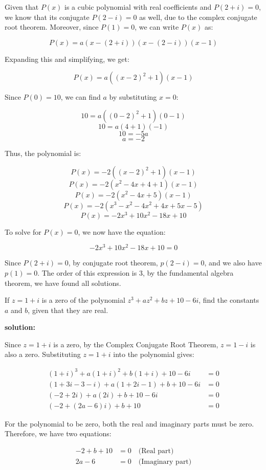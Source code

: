 \documentclass[
	12pt, %
	fleqn, %
	a4paper, %
]{LegrandOrangeBook}
\begin{document}
Given that \(P(x)\) is a cubic polynomial with real coefficients and \(P(2 + i) = 0\), we know that its conjugate \(P(2 - i) = 0\) as well, due to the complex conjugate root theorem. Moreover, since \(P(1) = 0\), we can write \(P(x)\) as:

\[ P(x) = a(x - (2 + i))(x - (2 - i))(x - 1) \]

Expanding this and simplifying, we get:

\[ P(x) = a((x - 2)^2 + 1)(x - 1) \]

Since \(P(0) = 10\), we can find \(a\) by substituting \(x = 0\):

\[ 10 = a((0 - 2)^2 + 1)(0 - 1) \]
\[ 10 = a(4 + 1)(-1) \]
\[ 10 = -5a \]
\[ a = -2 \]

Thus, the polynomial is:

\[ P(x) = -2((x - 2)^2 + 1)(x - 1) \]
\[ P(x) = -2(x^2 - 4x + 4 + 1)(x - 1) \]
\[ P(x) = -2(x^2 - 4x + 5)(x - 1) \]
\[ P(x) = -2(x^3 - x^2 - 4x^2 + 4x + 5x - 5) \]
\[ P(x) = -2x^3 + 10x^2 - 18x + 10 \]

To solve for \(P(x) = 0\), we now have the equation:

\[ -2x^3 + 10x^2 - 18x + 10 = 0 \]

Since $P(2+i) = 0$, by conjugate root theorem, $p(2-i) = 0$, and we also have $p(1) = 0$.
The order of this expression is 3, by the fundamental algebra theorem, we have found all solutions.

\begin{exercise}
    If \( z = 1 + i \) is a zero of the polynomial \( z^3 + az^2 + bz + 10 - 6i \), find the constants \( a \) and \( b \), given that they are real.
\end{exercise}
\textbf{solution:}

Since \( z = 1 + i \) is a zero, by the Complex Conjugate Root Theorem, \( z = 1 - i \) is also a zero. Substituting \( z = 1 + i \) into the polynomial gives:

\begin{align*}
(1 + i)^3 + a(1 + i)^2 + b(1 + i) + 10 - 6i &= 0 \\
(1 + 3i - 3 - i) + a(1 + 2i - 1) + b + 10 - 6i &= 0 \\
(-2 + 2i) + a(2i) + b + 10 - 6i &= 0 \\
(-2 + (2a - 6)i) + b + 10 &= 0
\end{align*}

For the polynomial to be zero, both the real and imaginary parts must be zero. Therefore, we have two equations:

\begin{align*}
-2 + b + 10 &= 0 \quad \text{(Real part)} \\
2a - 6 &= 0 \quad \text{(Imaginary part)}
\end{align*}
\end{document}
